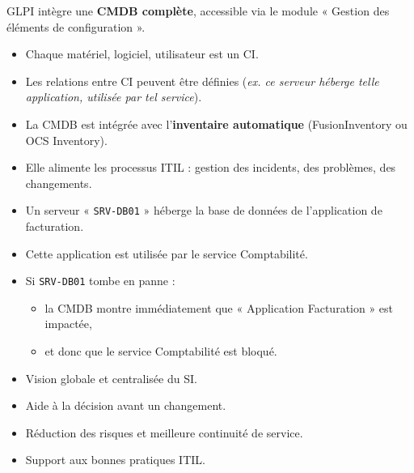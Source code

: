 \documentclass[a4paper,11pt]{article}
\begin{document}
\begin{tcolorbox}[colback=red!5,colframe=red!75!black,title={CMDB dans GLPI}]
GLPI intègre une \textbf{CMDB complète}, accessible via le module « Gestion des éléments de configuration ».
\begin{itemize}
  \item Chaque matériel, logiciel, utilisateur est un CI.
  \item Les relations entre CI peuvent être définies (\textit{ex. ce serveur héberge telle application, utilisée par tel service}).
  \item La CMDB est intégrée avec l’\textbf{inventaire automatique} (FusionInventory ou OCS Inventory).
  \item Elle alimente les processus ITIL : gestion des incidents, des problèmes, des changements.
\end{itemize}
\end{tcolorbox}

\begin{tcolorbox}[colback=purple!5,colframe=purple!75!black,title={Exemple concret}]
\begin{itemize}
  \item Un serveur « \texttt{SRV-DB01} » héberge la base de données de l’application de facturation.
  \item Cette application est utilisée par le service Comptabilité.
  \item Si \texttt{SRV-DB01} tombe en panne :
  \begin{itemize}
    \item la CMDB montre immédiatement que « Application Facturation » est impactée,
    \item et donc que le service Comptabilité est bloqué.
  \end{itemize}
\end{itemize}
\end{tcolorbox}

\begin{tcolorbox}[colback=yellow!5,colframe=yellow!75!black,title={Avantages pour l’entreprise}]
\begin{itemize}
  \item Vision globale et centralisée du SI.
  \item Aide à la décision avant un changement.
  \item Réduction des risques et meilleure continuité de service.
  \item Support aux bonnes pratiques ITIL.
\end{itemize}
\end{tcolorbox}
\end{document}

